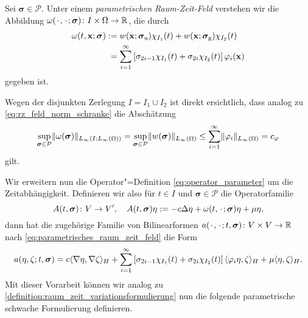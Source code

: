 \documentclass[../main.tex]{subfiles}
\begin{document}
\begin{Definition}
\label{definition:parametrisches_raum_zeit_feld}
    Sei $\bm\sigma \in \mathcal P$.
    Unter einem \emph{parametrischen Raum-Zeit-Feld} verstehen wir die Abbildung
    $\omega({\mkern2mu\cdot\mkern2mu}, {\mkern2mu\cdot\mkern2mu}; \bm\sigma) \colon I \times \Omega \to \mathbb{R}$, die durch
    \begin{equation}
    \label{eq:parametrisches_raum_zeit_feld}
        \begin{aligned}
            \omega(t, \mathbf{x}; \bm\sigma)
            &:= w(\mathbf{x}; \bm\sigma_{\text{u}}) \chi_{I_{1}}(t) + w(\mathbf{x}; \bm\sigma_{\text{g}}) \chi_{I_{2}}(t)\\
            &\phantom{:}= \sum_{i = 1}^{\infty} \left[\sigma_{2i-1} \chi_{I_{1}}(t) + \sigma_{2i} \chi_{I_{2}}(t)\right] \varphi_{i}(\mathbf{x})
        \end{aligned}
    \end{equation}
    gegeben ist.
\end{Definition}

Wegen der disjunkten Zerlegung $I = I_{1} \cup I_{2}$ ist direkt ersichtlich, dass analog zu \cref{eq:rz_feld_norm_schranke} die Abschätzung
\begin{equation}
\label{eq:parametrisches_raum_zeit_feld_schranke}
    \sup_{\bm\sigma \in \mathcal P} \lVert\omega(\bm\sigma)\rVert_{L_{\infty}(I; L_{\infty}(\Omega))}
    = \sup_{\bm\sigma \in \mathcal P} \lVert w(\bm\sigma)\rVert_{L_{\infty}(\Omega)} \leq \sum_{i = 1}^{\infty} \lVert\varphi_{i}\rVert_{L_{\infty}(\Omega)} = c_{\varphi}
\end{equation}
gilt.

Wir erweitern nun die Operator"=Definition \cref{eq:operator_parameter} um die Zeitabhängigkeit.
Definieren wir also für $t \in I$ und $\bm\sigma \in \mathcal P$ die Operatorfamilie
\begin{equation}
    \label{eq:operator_zeit_parameter}
    A(t, \bm\sigma) \colon V \to V', \quad A(t, \bm\sigma) \eta := -c \Delta \eta + \omega(t, {\mkern2mu\cdot\mkern2mu}; \bm\sigma) \eta + \mu \eta,
\end{equation}
dann hat die zugehörige Familie von Bilinearformen $a({\mkern2mu\cdot\mkern2mu}, {\mkern2mu\cdot\mkern2mu}; t, \bm\sigma) \colon V \times V \to \mathbb{R}$ nach \cref{eq:parametrisches_raum_zeit_feld} die Form
\begin{equation}
    \label{eq:bilinearform_zeit_parameter}
    \begin{aligned}
        a(\eta, \zeta; t, \bm\sigma) = c\langle\nabla \eta,\nabla \zeta\rangle_{H} + \sum_{i = 1}^{\infty} \left[ \sigma_{2i-1} \chi_{I_{1}}(t) + \sigma_{2i} \chi_{I_{2}}(t)  \right] \langle\varphi_{i} \eta,\zeta\rangle_{H} + \mu \langle\eta,\zeta\rangle_{H}.
    \end{aligned}
\end{equation}
Mit dieser Vorarbeit können wir analog zu \cref{definition:raum_zeit_variationsformulierung} nun die folgende parametrische schwache Formulierung definieren.
\end{document}
